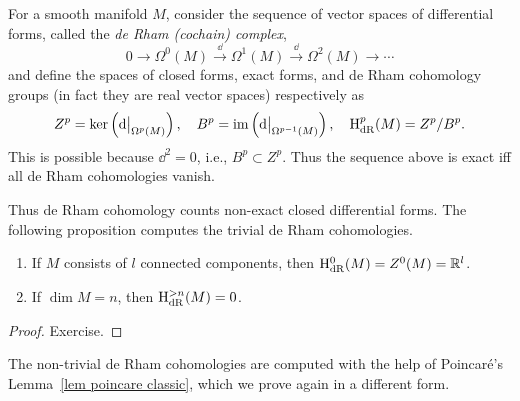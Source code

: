\begin{defn}
    For a smooth manifold $M$, consider the sequence of vector spaces of differential forms, called the \emph{de Rham (cochain) complex},
    \[0\to\Omega^0(M)\overset\dd\to\Omega^1(M)\overset\dd\to\Omega^2(M)\to\cdots\]
    and define the spaces of closed forms, exact forms, and de Rham cohomology groups (in fact they are real vector spaces) respectively as
    \[Z^p=\ker\left(\restr{\dd}{\Omega^p(M)}\right),\quad B^p=\im\left(\restr{\dd}{\Omega^{p-1}(M)}\right),\quad \rmH_{\rm dR}^p(M)=Z^p/B^p.\]
    This is possible because $\dd^2=0$, i.e., $B^p\subset Z^p$.
    Thus the sequence above is exact iff all de Rham cohomologies vanish.
\end{defn}
Thus de Rham cohomology counts non-exact closed differential forms. The following proposition computes the trivial de Rham cohomologies.

\begin{prop}\label{prop zeroth cohomology}
    \begin{enumerate}
    \item If $M$ consists of $l$ connected components, then $\mathrm{H}_{\rm dR}^0(M)=Z^0(M)=\mathbb{R}^l$.
    \item If $\dim M=n$, then $\mathrm{H}_{\rm dR}^{> n}(M)=0$.
\end{enumerate}
\end{prop}
\begin{proof}
    Exercise.
\end{proof}

The non-trivial de Rham cohomologies are computed with the help of Poincar\'e's Lemma~\ref{lem poincare classic}, which we prove again in a different form.

